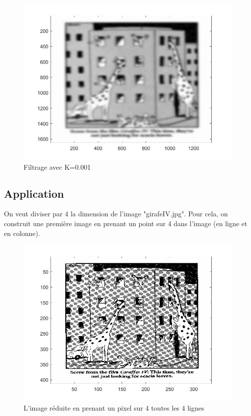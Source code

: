\documentclass[10pt,a4paper]{article}
\begin{document}
\begin{figure}[H]	\begin{center}
\includegraphics[scale=0.35]{imfiltree_k=0.001.jpg}
\caption{Filtrage avec K=0.001}
\label{XX}
\end{center}	\end{figure}

\subsection{Application}

On veut diviser par 4 la dimension de l'image "girafeIV.jpg". Pour cela, on construit une première image en prenant un point sur 4 dans l’image (en ligne et en colonne).


\begin{figure}[H]	\begin{center}
\includegraphics[scale=0.35]{girafe_reduite.jpg}
\caption{L'image réduite en prenant un pixel sur 4 toutes les 4 lignes}
\label{XX}
\end{center}	\end{figure}
\end{document}
